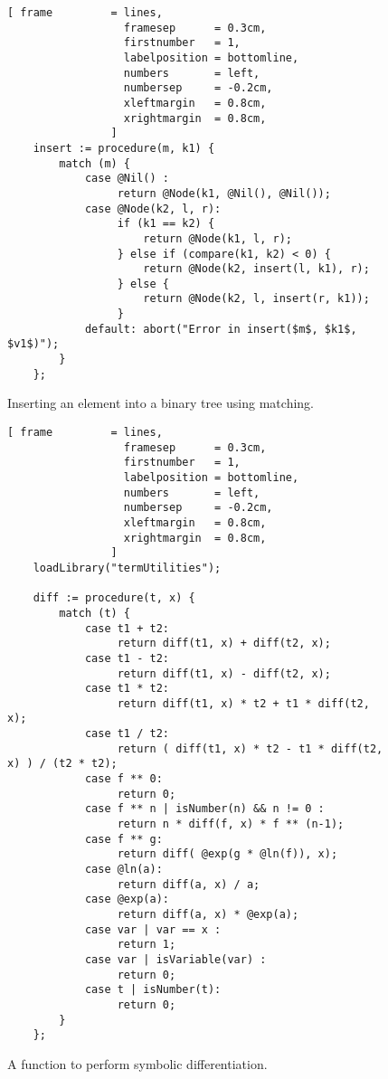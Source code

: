 \begin{figure}[!ht]
\centering
\begin{Verbatim}[ frame         = lines, 
                  framesep      = 0.3cm, 
                  firstnumber   = 1,
                  labelposition = bottomline,
                  numbers       = left,
                  numbersep     = -0.2cm,
                  xleftmargin   = 0.8cm,
                  xrightmargin  = 0.8cm,
                ]
    insert := procedure(m, k1) {
        match (m) {
            case @Nil() : 
                 return @Node(k1, @Nil(), @Nil());
            case @Node(k2, l, r): 
                 if (k1 == k2) {
                     return @Node(k1, l, r);
                 } else if (compare(k1, k2) < 0) { 
                     return @Node(k2, insert(l, k1), r);
                 } else {
                     return @Node(k2, l, insert(r, k1));
                 }
            default: abort("Error in insert($m$, $k1$, $v1$)");
        }
    };
\end{Verbatim}
\vspace*{-0.3cm}
\caption{Inserting an element into a binary tree using matching.}
\label{fig:binary-tree.stlx}
\end{figure}

\begin{figure}[!ht]
\centering
\begin{Verbatim}[ frame         = lines, 
                  framesep      = 0.3cm, 
                  firstnumber   = 1,
                  labelposition = bottomline,
                  numbers       = left,
                  numbersep     = -0.2cm,
                  xleftmargin   = 0.8cm,
                  xrightmargin  = 0.8cm,
                ]
    loadLibrary("termUtilities");

    diff := procedure(t, x) {
        match (t) {
            case t1 + t2:
                 return diff(t1, x) + diff(t2, x);
            case t1 - t2:
                 return diff(t1, x) - diff(t2, x);
            case t1 * t2:
                 return diff(t1, x) * t2 + t1 * diff(t2, x);
            case t1 / t2:
                 return ( diff(t1, x) * t2 - t1 * diff(t2, x) ) / (t2 * t2);
            case f ** 0:
                 return 0;
            case f ** n | isNumber(n) && n != 0 : 
                 return n * diff(f, x) * f ** (n-1);
            case f ** g:
                 return diff( @exp(g * @ln(f)), x);
            case @ln(a):
                 return diff(a, x) / a;
            case @exp(a):
                 return diff(a, x) * @exp(a);
            case var | var == x :
                 return 1;
            case var | isVariable(var) :
                 return 0;
            case t | isNumber(t):
                 return 0;
        }
    };
\end{Verbatim}
\vspace*{-0.3cm}
\caption{A function to perform symbolic differentiation.}
\label{fig:diff.stlx}
\end{figure}


